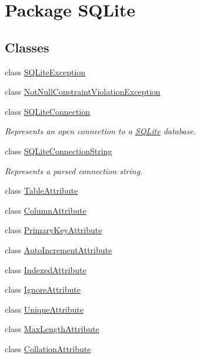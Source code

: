 \hypertarget{namespaceSQLite}{\section{Package S\-Q\-Lite}
\label{namespaceSQLite}
}
\subsection*{Classes}
\begin{DoxyCompactItemize}
\item 
class \hyperlink{classSQLite_1_1SQLiteException}{S\-Q\-Lite\-Exception}
\item 
class \hyperlink{classSQLite_1_1NotNullConstraintViolationException}{Not\-Null\-Constraint\-Violation\-Exception}
\item 
class \hyperlink{classSQLite_1_1SQLiteConnection}{S\-Q\-Lite\-Connection}
\begin{DoxyCompactList}\small\item\em Represents an open connection to a \hyperlink{namespaceSQLite}{S\-Q\-Lite} database. \end{DoxyCompactList}\item 
class \hyperlink{classSQLite_1_1SQLiteConnectionString}{S\-Q\-Lite\-Connection\-String}
\begin{DoxyCompactList}\small\item\em Represents a parsed connection string. \end{DoxyCompactList}\item 
class \hyperlink{classSQLite_1_1TableAttribute}{Table\-Attribute}
\item 
class \hyperlink{classSQLite_1_1ColumnAttribute}{Column\-Attribute}
\item 
class \hyperlink{classSQLite_1_1PrimaryKeyAttribute}{Primary\-Key\-Attribute}
\item 
class \hyperlink{classSQLite_1_1AutoIncrementAttribute}{Auto\-Increment\-Attribute}
\item 
class \hyperlink{classSQLite_1_1IndexedAttribute}{Indexed\-Attribute}
\item 
class \hyperlink{classSQLite_1_1IgnoreAttribute}{Ignore\-Attribute}
\item 
class \hyperlink{classSQLite_1_1UniqueAttribute}{Unique\-Attribute}
\item 
class \hyperlink{classSQLite_1_1MaxLengthAttribute}{Max\-Length\-Attribute}
\item 
class \hyperlink{classSQLite_1_1CollationAttribute}{Collation\-Attribute}

\end{DoxyCompactItemize}

